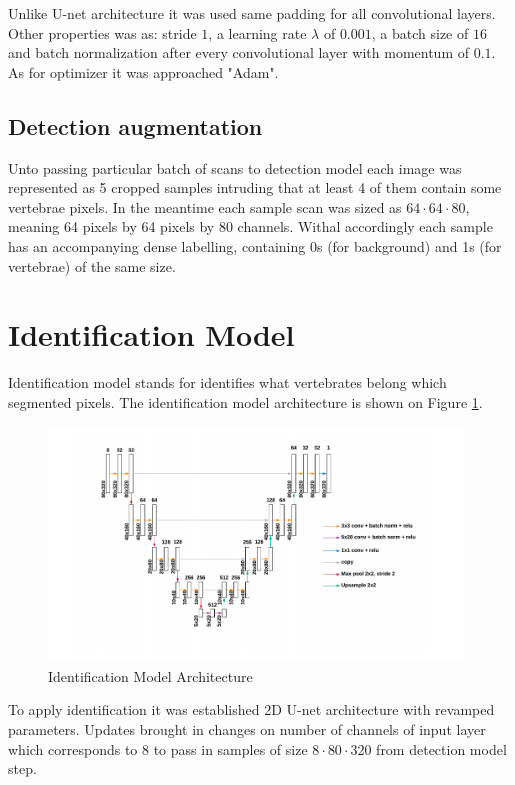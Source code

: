 Unlike U-net architecture it was used same padding for all convolutional layers. Other properties was as: stride $1$, a learning rate $\lambda$ of $0.001$, a batch size of $16$ and batch normalization after every convolutional layer with momentum of $0.1$. As for optimizer it was approached "Adam".
 
\subsection{Detection augmentation}
Unto passing particular batch of scans to detection model each image was represented as 5 cropped samples intruding that at least 4 of them contain some vertebrae pixels. In the meantime each sample scan was sized as $64 \cdot 64 \cdot 80$, meaning 64 pixels by 64 pixels by 80 channels. Withal accordingly each sample has an accompanying dense labelling, containing 0s (for background) and 1s (for vertebrae) of the same size.    
 
\section{Identification Model}
Identification model stands for identifies what vertebrates belong which segmented pixels. The identification model architecture is shown on Figure \ref{fig:identification_model}. 

\begin{figure}[h]
    \centering \includegraphics[width=11cm]{images/identification_model.png}
    \caption {Identification Model Architecture}
    \label{fig:identification_model}
\end{figure}

To apply identification it was established 2D U-net  architecture with revamped parameters. Updates brought in changes on number of channels of input layer which corresponds to $8$ to pass in samples of size $8 \cdot 80 \cdot 320$ from detection model step. 


